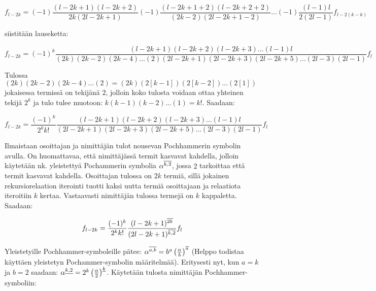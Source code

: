 \documentclass[../johdoksia.tex]{subfiles}
\begin{document}
	\begin{equation*}
		f_{l - 2k} = (-1)\frac{(l - 2k + 1)(l - 2k + 2)}{2k(2l - 2k + 1)}(-1)\frac{(l - 2k + 1 + 2)(l - 2k + 2 + 2)}{(2k - 2)(2l - 2k + 1 - 2)}\dots(-1)\frac{(l - 1)l}{2(2l - 1)}f_{l - 2(k - k)}
	\end{equation*}

	\noindent siistitään lauseketta:
	
	\begin{equation*}
		f_{l - 2k} = (-1)^k\frac{(l - 2k + 1)(l - 2k + 2)(l - 2k + 3)\dots(l - 1)l}{(2k)(2k - 2)(2k - 4)\dots(2)(2l - 2k + 1)(2l - 2k + 3)(2l - 2k + 5)\dots(2l - 3)(2l - 1)}f_l
	\end{equation*}

	\noindent Tulossa $(2k)(2k - 2)(2k - 4)\dots(2) = (2k)(2[k - 1])(2[k - 2])\dots(2[1])$ jokaisessa termissä on tekijänä $2$, jolloin koko tulosta voidaan ottaa yhteinen tekijä $2^k$ ja tulo tulee muotoon: $k(k - 1)(k - 2)\dots (1) = k!$. Saadaan:
	
	\begin{equation*}
		f_{l - 2k} = \frac{(-1)^k}{2^k k!}\frac{(l - 2k + 1)(l - 2k + 2)(l - 2k + 3)\dots(l - 1)l}{(2l - 2k + 1)(2l - 2k + 3)(2l - 2k + 5)\dots(2l - 3)(2l - 1)}f_l
	\end{equation*}

	\noindent Ilmaistaan osoittajan ja nimittäjän tulot nousevan Pochhammerin symbolin avulla. On huomattavaa, että nimittäjässä termit kasvavat kahdella, jolloin käytetään nk. yleistettyä Pochammerin symbolia $\alpha^{\overline{k,2}}$, jossa $2$ tarkoittaa että termit kasvavat kahdella. Osoittajan tulossa on $2k$ termiä, sillä jokainen rekursiorelaation iterointi tuotti kaksi uutta termiä osoittajaan ja relaatiota iteroitiin $k$ kertaa. Vastaavasti nimittäjän tulossa termejä on $k$ kappaletta. Saadaan:
	
	\begin{equation*}
		f_{l - 2k} = \frac{(-1)^k}{2^k k!}\frac{(l - 2k + 1)^{\overline{2k}}}{(2l - 2k + 1)^{\overline{k,2}}}f_l
	\end{equation*}

	\noindent Yleistetyille Pochhammer-symboleille pätee: $\alpha^{\overline{a,b}} = b^a\left(\frac{\alpha}{b}\right)^{\overline{a}}$ (Helppo todistaa käyttäen yleistetyn Pochammer-symbolin määritelmää). Eritysesti nyt, kun $a = k$ ja $b = 2$ saadaan: $\alpha^{\underline{k,2}} = 2^k\left(\frac{\alpha}{2}\right)^{\underline{k}}$. Käytetään tulosta nimittäjän Pochhammer-symboliin:
	
\end{document}
